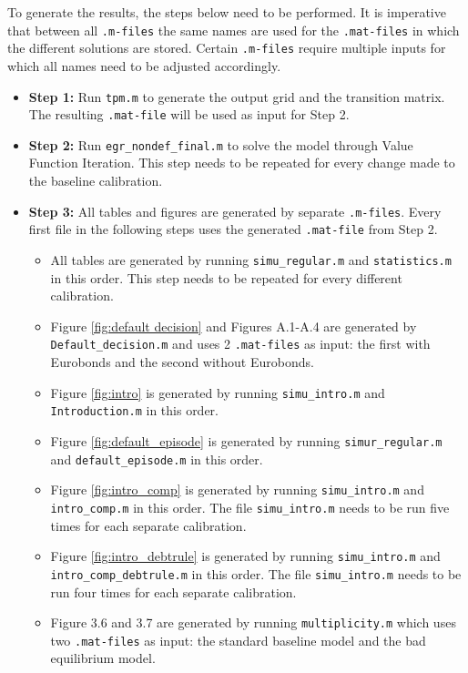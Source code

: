 \begin{appendices}
To generate the results, the steps below need to be performed. It is imperative that between all \texttt{.m-files} the same names are used for the \texttt{.mat-files} in which the different solutions are stored. Certain \texttt{.m-files} require multiple inputs for which all names need to be adjusted accordingly. 
\begin{itemize}
    \item \textbf{Step 1:} Run \texttt{tpm.m} to generate the output grid and the transition matrix. The resulting \texttt{.mat-file} will be used as input for Step 2.
    \item \textbf{Step 2:} Run \texttt{egr\_nondef\_final.m} to solve the model through Value Function Iteration. This step needs to be repeated for every change made to the baseline calibration.
    \item \textbf{Step 3:} All tables and figures are generated by separate \texttt{.m-files}. Every first file in the following steps uses the generated \texttt{.mat-file} from Step 2.
    \begin{itemize}
        \item All tables are generated by running \texttt{simu\_regular.m} and \texttt{statistics.m} in this order. This step needs to be repeated for every different calibration.
        \item Figure \ref{fig:default decision} and Figures A.1-A.4 are generated by \texttt{Default\_decision.m} and uses 2 \texttt{.mat-files} as input: the first with Eurobonds and the second without Eurobonds.
        \item Figure \ref{fig:intro} is generated by running \texttt{simu\_intro.m} and \texttt{Introduction.m} in this order.
        \item Figure \ref{fig:default_episode} is generated by running \texttt{simur\_regular.m} and \texttt{default\_episode.m} in this order.
        \item Figure \ref{fig:intro_comp} is generated by running \texttt{simu\_intro.m} and \texttt{intro\_comp.m} in this order. The file \texttt{simu\_intro.m} needs to be run five times for each separate calibration.
        \item Figure \ref{fig:intro_debtrule} is generated by running \texttt{simu\_intro.m} and \texttt{intro\_comp\_debtrule.m} in this order. The file \texttt{simu\_intro.m} needs to be run four times for each separate calibration.
        \item Figure 3.6 and 3.7 are generated by running \texttt{multiplicity.m} which uses two \texttt{.mat-files} as input: the standard baseline model and the bad equilibrium model.
    \end{itemize}
\end{itemize}
\end{appendices}


